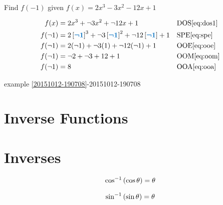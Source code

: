 \documentclass[20150903-160354-rs2.2-MarksMathNotebook.tex]{subfiles}
\begin{document}
\begin{example}[id:20151012-203549] \label{20151012-203549} \hfill \\
Find $f(-1)$ given $f(x)=2x^3-3x^2-12x+1$

\soln

\solnsteps
\begin{align*}
f(x) & =2x^3 + \neg 3x^2 + \neg 12x+1 && \text{DOS} \eqref{eq:dos1} \\
f(\neg 1) &= 2\farg{\neg 1}^3 + \neg 3\farg{\neg 1}^2 + \neg 12 \farg{\neg 1} +1 && \text{SPE} \eqref{eq:spe} \\
f(\neg 1) &= 2(\neg 1) + \neg 3(1) + \neg 12(\neg 1) + 1 && \text{OOE} \eqref{eq:ooe} \\
f(\neg 1) &= \neg 2 + \neg 3 + 12 +1 && \text{OOM} \eqref{eq:oom} \\
f(\neg 1) &= 8 && \text{OOA} \eqref{eq:ooa} \\
\end{align*}

\qdepend

\qdependlist
example \ref{20151012-190708}-20151012-190708

\end{example}



\section{Inverse Functions}


\section{Inverses}


\begin{property}
\begin{subequations}
\begin{align}
\cos^{-1} \left(\cos \theta \right) = \theta \label{eq:arccos}
\end{align}
\end{subequations}
\end{property}

\begin{property}
\begin{subequations}
\begin{align}
\sin^{-1} \left(\sin \theta \right) = \theta  \label{eq:arcsin}
\end{align}
\end{subequations}
\end{property}
\end{document}
